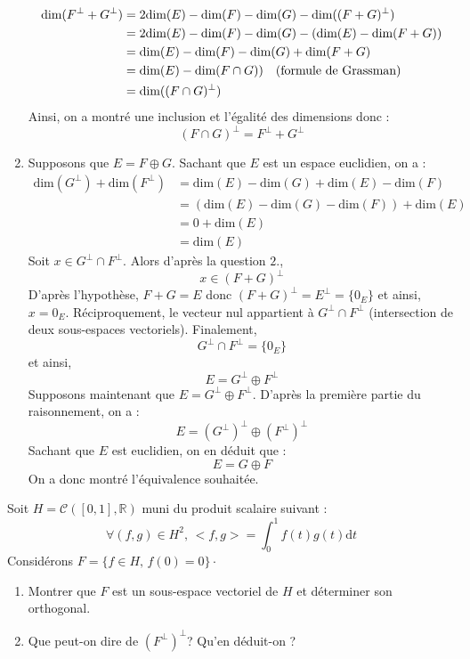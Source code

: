 \documentclass[a4paper,twoside,french,11pt]{VcCours}
\newcommand{\dt}{\text{d}t}
\begin{document}
\begin{enumerate}
\begin{align*}
 \textrm{dim}(F^{\perp}+G^{\perp}) & = 2 \textrm{dim}(E) - \textrm{dim}(F) - \textrm{dim}(G) - \textrm{dim}((F+G)^{\perp})\\
 & =  2 \textrm{dim}(E) - \textrm{dim}(F) - \textrm{dim}(G) -  (\textrm{dim}(E) - \textrm{dim}(F+G)) \\
 & = \textrm{dim}(E) - \textrm{dim}(F) - \textrm{dim}(G) + \textrm{dim}(F+G) \\
 & =  \textrm{dim}(E) -  \textrm{dim}(F \cap G)) \quad \hbox{(formule de Grassman)} \\
 & = \textrm{dim}((F \cap G)^{\perp}) 
 \end{align*}
 Ainsi, on a montré une inclusion et l'égalité des dimensions donc :
$$(F\cap G)^{\perp}=F^{\perp}+G^{\perp}$$
\item Supposons que $E=F\oplus G$. Sachant que $E$ est un espace euclidien, on a :
\begin{align*}
\textrm{dim}(G^{\perp}) + \textrm{dim}(F^{\perp})& = \textrm{dim}(E)- \textrm{dim}(G) + \textrm{dim}(E)- \textrm{dim}(F) \\
& = (\textrm{dim}(E)- \textrm{dim}(G)- \textrm{dim}(F)) + \textrm{dim}(E) \\
& =  0  + \textrm{dim}(E) \\
& = \textrm{dim}(E) 
\end{align*}
Soit $x \in G^{\perp} \cap F^{\perp}$. Alors d'après la question $2.$, 
$$ x \in (F+G)^{\perp}$$
D'après l'hypothèse, $F+G=E$ donc $(F+G)^{\perp}= E^{\perp} = \lbrace 0_E \rbrace$ et ainsi, $x =0_E$. Réciproquement, le vecteur nul appartient à $G^{\perp} \cap F^{\perp}$ (intersection de deux sous-espaces vectoriels). Finalement,
$$ G^{\perp} \cap F^{\perp} = \lbrace 0_E \rbrace$$
et ainsi,
$$ E=G^{\perp}\oplus F^{\perp}$$
Supposons maintenant que $E=G^{\perp}\oplus F^{\perp}$. D'après la première partie du raisonnement, on a :
$$ E=(G^{\perp})^{\perp} \oplus (F^{\perp})^{\perp}$$
Sachant que $E$ est euclidien, on en déduit que :
$$ E= G \oplus F$$
On a donc montré l'équivalence souhaitée.
\end{enumerate}

\begin{Exercice}{} Soit $H= \mathcal{C}([0,1],\mathbb{R})$ muni du produit scalaire suivant :
$$ \forall (f,g) \in H^2, \, <f,g> = \int_{0}^1 f(t) g(t) \dt $$
Considérons $F= \lbrace f \in H, \, f(0)=0 \rbrace \cdot$

\begin{enumerate}
\item Montrer que $F$ est un sous-espace vectoriel de $H$ et déterminer son orthogonal.
\item Que peut-on dire de $(F^{\perp})^{\perp}$? Qu'en déduit-on ?
\end{enumerate}
\end{Exercice}
\end{document}
